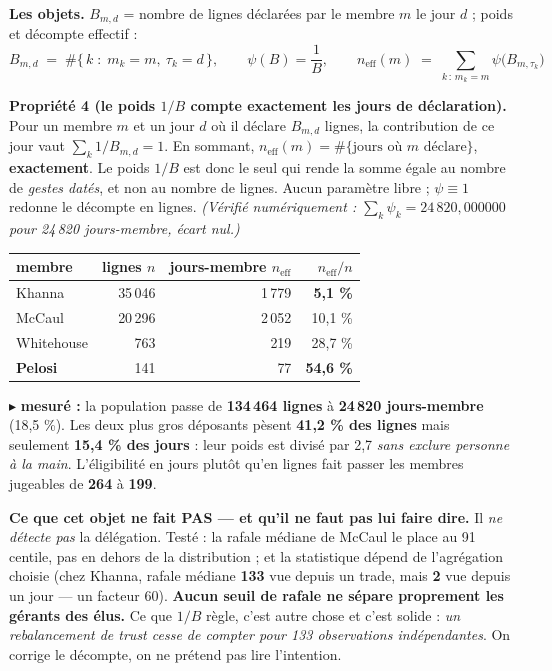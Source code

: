 \documentclass[11pt,a4paper]{article}
\newcommand{\prop}[2]{\vspace{0.6mm}\begin{mdframed}[linecolor=vert!60, backgroundcolor=vert!5, linewidth=0.6pt,
  roundcorner=3pt, innertopmargin=3pt, innerbottommargin=3pt]{\color{vert}\textbf{Propriété #1.}} #2\end{mdframed}\vspace{0.4mm}}
\newcommand{\mes}[1]{{\color{rouge}\small$\blacktriangleright$ \textbf{mesuré :} #1}\par}
\begin{document}
\textbf{Les objets.} $B_{m,d}$ = nombre de lignes déclarées par le membre $m$ le jour $d$ ; poids et décompte effectif :
\[
B_{m,d} \;=\; \#\bigl\{\, k \;:\; m_k = m,\ \tau_k = d \,\bigr\},
\qquad
\psi(B) = \frac{1}{B},
\qquad
n_{\text{eff}}(m) \;=\; \sum_{k \,:\, m_k = m} \psi\bigl(B_{m,\tau_k}\bigr)
\]

\prop{4 (le poids $1/B$ compte exactement les jours de déclaration)}{Pour un membre $m$ et un jour $d$ où il
déclare $B_{m,d}$ lignes, la contribution de ce jour vaut $\sum_{k} 1/B_{m,d} = 1$. En sommant,
$n_{\text{eff}}(m) = \#\{\text{jours où } m \text{ déclare}\}$, \textbf{exactement}. Le poids $1/B$ est donc le seul qui
rende la somme égale au nombre de \emph{gestes datés}, et non au nombre de lignes. Aucun paramètre libre ;
$\psi \equiv 1$ redonne le décompte en lignes.
\emph{(Vérifié numériquement : $\sum_k \psi_k = 24\,820{,}000000$ pour 24\,820 jours-membre, écart nul.)}}

\begin{center}\footnotesize
\begin{tabular}{@{}l r r r@{}}
\toprule
membre & lignes $n$ & \textbf{jours-membre} $n_{\text{eff}}$ & $n_{\text{eff}}/n$ \\
\midrule
Khanna & 35\,046 & 1\,779 & \textbf{5,1 \%} \\
McCaul & 20\,296 & 2\,052 & 10,1 \% \\
Whitehouse & \phantom{0,0}763 & \phantom{0,0}219 & 28,7 \% \\
\textbf{Pelosi} & \phantom{0,0}141 & \phantom{0,00}77 & \textbf{54,6 \%} \\
\bottomrule
\end{tabular}
\end{center}
\vspace{-1mm}
\mes{la population passe de \textbf{134\,464 lignes} à \textbf{24\,820 jours-membre} (18,5 \%). Les deux plus gros
déposants pèsent \textbf{41,2 \% des lignes} mais seulement \textbf{15,4 \% des jours} : leur poids est divisé par 2,7
\emph{sans exclure personne à la main}. L'éligibilité en jours plutôt qu'en lignes fait passer les membres jugeables
de \textbf{264} à \textbf{199}.}

\begin{mdframed}[linecolor=rouge!60, backgroundcolor=rouge!5, linewidth=0.6pt, roundcorner=3pt,
  innertopmargin=3pt, innerbottommargin=3pt]
{\small\textbf{Ce que cet objet ne fait PAS --- et qu'il ne faut pas lui faire dire.} Il \emph{ne détecte pas} la
délégation. Testé : la rafale médiane de McCaul le place au 91\ieme{} centile, pas en dehors de la distribution ;
et la statistique dépend de l'agrégation choisie (chez Khanna, rafale médiane \textbf{133} vue depuis un trade,
mais \textbf{2} vue depuis un jour --- un facteur 60). \textbf{Aucun seuil de rafale ne sépare proprement les gérants
des élus.} Ce que $1/B$ règle, c'est autre chose et c'est solide : \emph{un rebalancement de trust cesse de compter
pour 133 observations indépendantes}. On corrige le décompte, on ne prétend pas lire l'intention.}
\end{mdframed}
\end{document}
